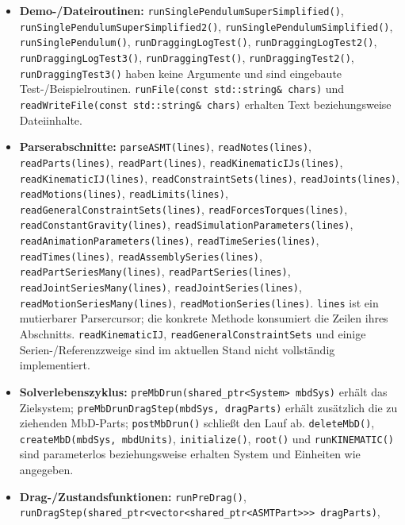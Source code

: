 \documentclass[
  12pt
]{book}
\providecommand{\tightlist}{%
  \setlength{\itemsep}{0pt}\setlength{\parskip}{0pt}}
\begin{document}
\begin{itemize}
\tightlist
\item
  \textbf{Demo-/Dateiroutinen:}
  \texttt{runSinglePendulumSuperSimplified()},
  \texttt{runSinglePendulumSuperSimplified2()},
  \texttt{runSinglePendulumSimplified()}, \texttt{runSinglePendulum()},
  \texttt{runDraggingLogTest()}, \texttt{runDraggingLogTest2()},
  \texttt{runDraggingLogTest3()}, \texttt{runDraggingTest()},
  \texttt{runDraggingTest2()}, \texttt{runDraggingTest3()} haben keine
  Argumente und sind eingebaute Test-/Beispielroutinen.
  \texttt{runFile(const\ std::string\&\ chars)} und
  \texttt{readWriteFile(const\ std::string\&\ chars)} erhalten Text
  beziehungsweise Dateiinhalte.
\item
  \textbf{Parserabschnitte:} \texttt{parseASMT(lines)},
  \texttt{readNotes(lines)}, \texttt{readParts(lines)},
  \texttt{readPart(lines)}, \texttt{readKinematicIJs(lines)},
  \texttt{readKinematicIJ(lines)}, \texttt{readConstraintSets(lines)},
  \texttt{readJoints(lines)}, \texttt{readMotions(lines)},
  \texttt{readLimits(lines)}, \texttt{readGeneralConstraintSets(lines)},
  \texttt{readForcesTorques(lines)},
  \texttt{readConstantGravity(lines)},
  \texttt{readSimulationParameters(lines)},
  \texttt{readAnimationParameters(lines)},
  \texttt{readTimeSeries(lines)}, \texttt{readTimes(lines)},
  \texttt{readAssemblySeries(lines)},
  \texttt{readPartSeriesMany(lines)}, \texttt{readPartSeries(lines)},
  \texttt{readJointSeriesMany(lines)}, \texttt{readJointSeries(lines)},
  \texttt{readMotionSeriesMany(lines)},
  \texttt{readMotionSeries(lines)}. \texttt{lines} ist ein mutierbarer
  Parsercursor; die konkrete Methode konsumiert die Zeilen ihres
  Abschnitts. \texttt{readKinematicIJ},
  \texttt{readGeneralConstraintSets} und einige Serien-/Referenzzweige
  sind im aktuellen Stand nicht vollständig implementiert.
\item
  \textbf{Solverlebenszyklus:}
  \texttt{preMbDrun(shared\_ptr\textless{}System\textgreater{}\ mbdSys)}
  erhält das Zielsystem; \texttt{preMbDrunDragStep(mbdSys,\ dragParts)}
  erhält zusätzlich die zu ziehenden MbD-Parts; \texttt{postMbDrun()}
  schließt den Lauf ab. \texttt{deleteMbD()},
  \texttt{createMbD(mbdSys,\ mbdUnits)}, \texttt{initialize()},
  \texttt{root()} und \texttt{runKINEMATIC()} sind parameterlos
  beziehungsweise erhalten System und Einheiten wie angegeben.
\item
  \textbf{Drag-/Zustandsfunktionen:} \texttt{runPreDrag()},
  \texttt{runDragStep(shared\_ptr\textless{}vector\textless{}shared\_ptr\textless{}ASMTPart\textgreater{}\textgreater{}\textgreater{}\ dragParts)},

\end{itemize}
\end{document}
